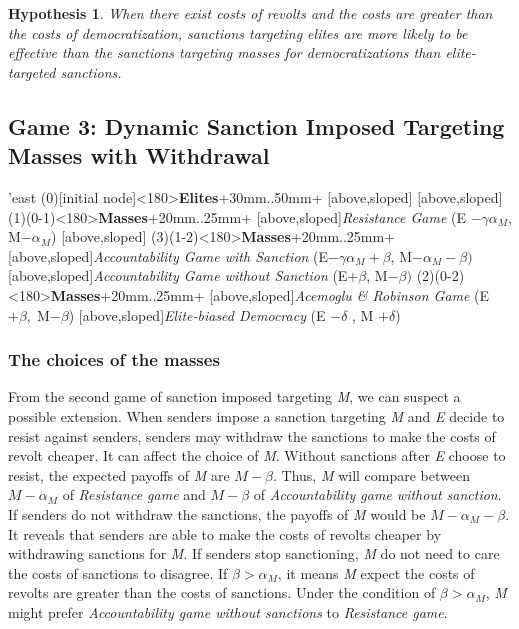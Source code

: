 \documentclass[11pt, letterpage, titlepage]{article}
\newtheorem{hyp}{Hypothesis}
\begin{document}
\begin{hyp}
\label{hyp2}
	When there exist costs of revolts and the costs are greater than the costs of democratization, sanctions targeting elites are more likely to be effective than the sanctions targeting masses for democratizations than elite-targeted sanctions.
\end{hyp}

\subsection*{Game 3: Dynamic Sanction Imposed Targeting Masses with Withdrawal}
\begin{center}
\begin{istgame}[font=\footnotesize]
	\centering
	\setistgrowdirection'{east}
	\xtShowArrows
	\istroot(0)[initial node]<180>{\textbf{Elites}}+30mm..50mm+
	[above,sloped]  [above,sloped] \endist
	\istroot(1)(0-1)<180>{\textbf{Masses}}+20mm..25mm+
	[above,sloped]{\textit{Resistance Game} (E $- \gamma\alpha_{M}$, M$-\alpha_{M}$) }
	[above,sloped]{ }  \endist
	\istroot(3)(1-2)<180>{\textbf{Masses}}+20mm..25mm+
	[above,sloped]{\textit{Accountability Game with Sanction}
		 (E$-\gamma\alpha_{M}+\beta$, M$-\alpha_{M}-\beta)$}
	[above,sloped]{\textit{Accountability Game without Sanction} 
		(E$+\beta$, M$-\beta)$} \endist
	\istroot(2)(0-2)<180>{\textbf{Masses}}+20mm..25mm+
	[above,sloped]{\textit{Acemoglu \& Robinson Game} (E $+ \beta,\; $M$-\beta$)}
	[above,sloped]{\textit{Elite-biased Democracy} (E $-\delta$ , M $+ \delta$)} \endist
\end{istgame}
\end{center}	

\subsubsection*{The choices of the masses}

From the second game of sanction imposed targeting \textit{M}, we can suspect a possible extension. When senders impose a sanction targeting \textit{M} and \textit{E} decide to resist against senders, senders may withdraw the sanctions to make the costs of revolt cheaper. It can affect the choice of \textit{M}. Without sanctions after \textit{E} choose to resist, the expected payoffs of \textit{M} are $M-\beta$. Thus, \textit{M} will compare between $M-\alpha_{M}$ of \textit{Resistance game} and $M-\beta$ of \textit{Accountability game without sanction}. If senders do not withdraw the sanctions, the payoffs of \textit{M} would be $M-\alpha_{M}-\beta$. It reveals that senders are able to make the costs of revolts cheaper by withdrawing sanctions for \textit{M}. If senders stop sanctioning, \textit{M} do not need to care the costs of sanctions to disagree. If $\beta > \alpha_{M}$, it means \textit{M} expect the costs of revolts are greater than the costs of sanctions. Under the condition of $\beta  > \alpha_{M}$, \textit{M} might prefer \textit{Accountability game without sanctions} to \textit{Resistance game}.
\end{document}
